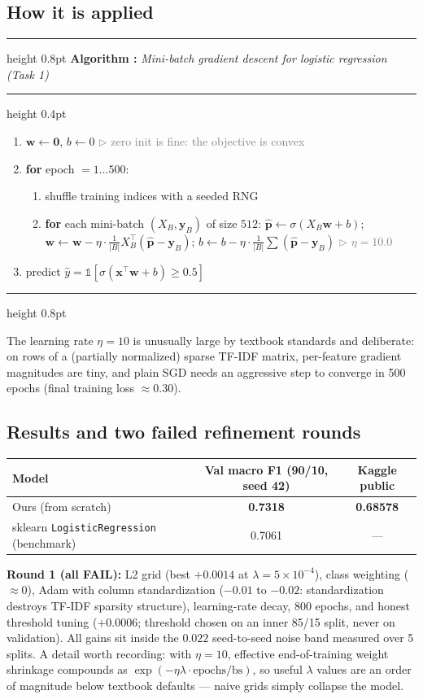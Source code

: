 \documentclass[11pt,a4paper]{article}
\newcounter{algctr}
\newenvironment{algo}[1]{%
  \par\medskip\refstepcounter{algctr}%
  \noindent\hrule height 0.8pt \smallskip
  \noindent\textbf{Algorithm \thealgctr:} \emph{#1}\par\smallskip
  \hrule height 0.4pt \smallskip
  \begin{enumerate}\setlength{\itemsep}{1pt}\setlength{\parskip}{0pt}%
}{%
  \end{enumerate}\smallskip\hrule height 0.8pt \medskip
}
\newcommand{\stateComment}[1]{\hfill\textcolor{gray}{\footnotesize $\triangleright$ #1}}
\newcommand{\sig}{\sigma}
\begin{document}
\subsection{How it is applied}
\begin{algo}{Mini-batch gradient descent for logistic regression (Task 1)}
\item $\mathbf{w} \gets \mathbf{0}$, $b \gets 0$ \stateComment{zero init is fine: the objective is convex}
\item \textbf{for} epoch $= 1 \dots 500$:
  \begin{enumerate}
  \item shuffle training indices with a seeded RNG
  \item \textbf{for} each mini-batch $(X_B, \mathbf{y}_B)$ of size $512$:\quad
        $\hat{\mathbf{p}} \gets \sig(X_B \mathbf{w} + b)$;\quad
        $\mathbf{w} \gets \mathbf{w} - \eta \cdot \tfrac{1}{|B|} X_B^\top (\hat{\mathbf{p}} - \mathbf{y}_B)$;\quad
        $b \gets b - \eta \cdot \tfrac{1}{|B|}\sum(\hat{\mathbf{p}} - \mathbf{y}_B)$ \stateComment{$\eta = 10.0$}
  \end{enumerate}
\item predict $\hat{y} = \mathbb{1}[\sig(\mathbf{x}^\top\mathbf{w} + b) \ge 0.5]$
\end{algo}

The learning rate $\eta = 10$ is unusually large by textbook standards and deliberate: on rows of a (partially normalized) sparse TF-IDF matrix, per-feature gradient magnitudes are tiny, and plain SGD needs an aggressive step to converge in 500 epochs (final training loss ${\approx}0.30$).

\subsection{Results and two failed refinement rounds}
\begin{center}
\begin{tabular}{lcc}
\toprule
Model & Val macro F1 (90/10, seed 42) & Kaggle public\\
\midrule
Ours (from scratch) & \textbf{0.7318} & \textbf{0.68578}\\
sklearn \texttt{LogisticRegression} (benchmark) & 0.7061 & ---\\
\bottomrule
\end{tabular}
\end{center}

\textbf{Round 1 (all FAIL):} L2 grid (best $+0.0014$ at $\lambda{=}5{\times}10^{-4}$), class weighting ($\approx 0$), Adam \cite{kingma2015} with column standardization ($-0.01$ to $-0.02$: standardization destroys TF-IDF sparsity structure), learning-rate decay, 800 epochs, and honest threshold tuning ($+0.0006$; threshold chosen on an inner 85/15 split, never on validation). All gains sit inside the $0.022$ seed-to-seed noise band measured over 5 splits. A detail worth recording: with $\eta = 10$, effective end-of-training weight shrinkage compounds as $\exp(-\eta\lambda \cdot \text{epochs}/\text{bs})$, so useful $\lambda$ values are an order of magnitude below textbook defaults --- naive grids simply collapse the model.
\end{document}
